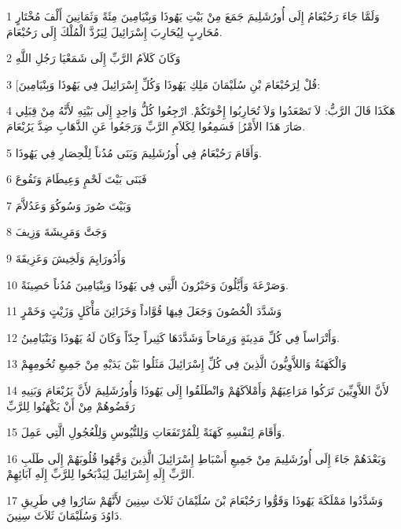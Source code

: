 \par 1 وَلَمَّا جَاءَ رَحُبْعَامُ إِلَى أُورُشَلِيمَ جَمَعَ مِنْ بَيْتِ يَهُوذَا وَبِنْيَامِينَ مِئَةً وَثَمَانِينَ أَلْفَ مُخْتَارٍ مُحَارِبٍ لِيُحَارِبَ إِسْرَائِيلَ لِيَرُدَّ الْمُلْكَ إِلَى رَحُبْعَامَ.
\par 2 وَكَانَ كَلاَمُ الرَّبِّ إِلَى شَمَعْيَا رَجُلِ اللَّهِ
\par 3 [قُلْ لِرَحُبْعَامَ بْنِ سُلَيْمَانَ مَلِكِ يَهُوذَا وَكُلِّ إِسْرَائِيلَ فِي يَهُوذَا وَبِنْيَامِينَ:
\par 4 هَكَذَا قَالَ الرَّبُّ: لاَ تَصْعَدُوا وَلاَ تُحَارِبُوا إِخْوَتَكُمْ. ارْجِعُوا كُلُّ وَاحِدٍ إِلَى بَيْتِهِ لأَنَّهُ مِنْ قِبَلِي صَارَ هَذَا الأَمْرُ] فَسَمِعُوا لِكَلاَمِ الرَّبِّ وَرَجَعُوا عَنِ الذَّهَابِ ضِدَّ يَرُبْعَامَ.
\par 5 وَأَقَامَ رَحُبْعَامُ فِي أُورُشَلِيمَ وَبَنَى مُدُناً لِلْحِصَارِ فِي يَهُوذَا.
\par 6 فَبَنَى بَيْتَ لَحْمٍ وَعِيطَامَ وَتَقُوعَ
\par 7 وَبَيْتَ صُورَ وَسُوكُوَ وَعَدُلاَّمَ
\par 8 وَجَتَّ وَمَرِيشَةَ وَزِيفَ
\par 9 وَأَدُورَايِمَ وَلَخِيشَ وَعَزِيقَةَ
\par 10 وَصَرْعَةَ وَأَيَّلُونَ وَحَبْرُونَ الَّتِي فِي يَهُوذَا وَبِنْيَامِينَ مُدُناً حَصِينَةً.
\par 11 وَشَدَّدَ الْحُصُونَ وَجَعَلَ فِيهَا قُوَّاداً وَخَزَائِنَ مَأْكَلٍ وَزَيْتٍ وَخَمْرٍ
\par 12 وَأَتْرَاساً فِي كُلِّ مَدِينَةٍ وَرِمَاحاً وَشَدَّدَهَا كَثِيراً جِدّاً وَكَانَ لَهُ يَهُوذَا وَبَنْيَامِينُ.
\par 13 وَالْكَهَنَةُ وَاللاَّوِيُّونَ الَّذِينَ فِي كُلِّ إِسْرَائِيلَ مَثَلُوا بَيْنَ يَدَيْهِ مِنْ جَمِيعِ تُخُومِهِمْ
\par 14 لأَنَّ اللاَّوِيِّينَ تَرَكُوا مَرَاعِيَهُمْ وَأَمْلاَكَهُمْ وَانْطَلَقُوا إِلَى يَهُوذَا وَأُورُشَلِيمَ لأَنَّ يَرُبْعَامَ وَبَنِيهِ رَفَضُوهُمْ مِنْ أَنْ يَكْهَنُوا لِلرَّبِّ
\par 15 وَأَقَامَ لِنَفْسِهِ كَهَنَةً لِلْمُرْتَفَعَاتِ وَلِلتُّيُوسِ وَلِلْعُجُولِ الَّتِي عَمِلَ.
\par 16 وَبَعْدَهُمْ جَاءَ إِلَى أُورُشَلِيمَ مِنْ جَمِيعِ أَسْبَاطِ إِسْرَائِيلَ الَّذِينَ وَجَّهُوا قُلُوبَهُمْ إِلَى طَلَبِ الرَّبِّ إِلَهِ إِسْرَائِيلَ لِيَذْبَحُوا لِلرَّبِّ إِلَهِ آبَائِهِمْ.
\par 17 وَشَدَّدُوا مَمْلَكَةَ يَهُوذَا وَقَوُّوا رَحُبْعَامَ بْنَ سُلَيْمَانَ ثَلاَثَ سِنِينَ لأَنَّهُمْ سَارُوا فِي طَرِيقِ دَاوُدَ وَسُلَيْمَانَ ثَلاَثَ سِنِينَ.
